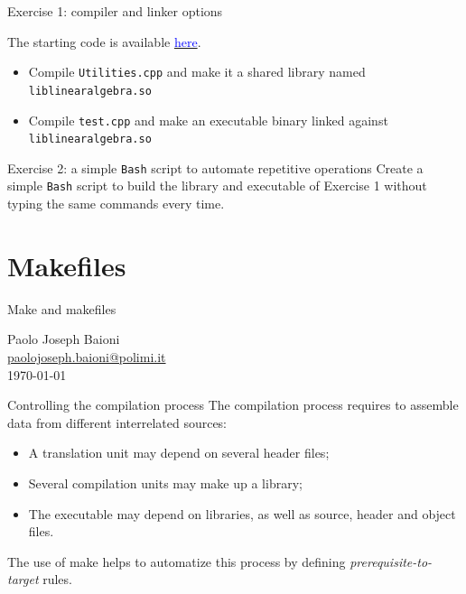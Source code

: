 \documentclass[10pt,aspectratio=169]{beamer}
\begin{document}
\begin{frame}{Exercise 1: compiler and linker options}
	
  The starting code is available \href{https://github.com/pacs-course/pacs-Labs/tree/main/Labs/2025/02-compile/src}{ \textcolor{blue}{here}}.	
  \begin{itemize}
  \item Compile \texttt{Utilities.cpp} and make it a shared library named \texttt{liblinearalgebra.so}
  \item Compile \texttt{test.cpp} and make an executable binary linked against \texttt{liblinearalgebra.so}
  \end{itemize}
   
  
\end{frame}

\begin{frame}{Exercise 2: a simple \texttt{Bash} script to automate repetitive operations}
  Create a simple \texttt{Bash} script to build the library and executable of Exercise 1 without typing the same commands every time.
\end{frame}

\section*{Makefiles}

\begin{frame}
\centering
{ \huge Make and makefiles}\\

\vspace{1cm}

\large Paolo Joseph Baioni \\ \href{mailto:paolojoseph.baioni@polimi.it}{\normalsize\color{blue}paolojoseph.baioni@polimi.it}\\

\vfill\today
\end{frame}

\begin{frame}{Controlling the compilation process}
The compilation process requires to assemble data from different interrelated sources:
\smallskip

\begin{itemize}
\item A translation unit may depend on several header files; 
\item Several compilation units may make up a library;
\item The executable may depend on libraries, as well as source, header and object files.
\end{itemize}

The use of \alert{make} helps to automatize this process by defining
\emph{prerequisite-to-target} rules.
\end{frame}
\end{document}
